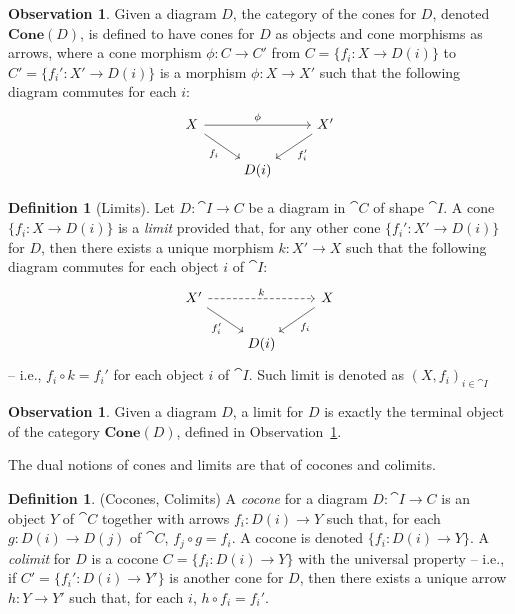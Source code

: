 \documentclass[a4paper, twoside,openright]{report}
\theoremstyle{plain}
\theoremstyle{definition}
\newtheorem{definition}[theorem]{Definition}
\newtheorem{obs}[theorem]{Observation}
\begin{document}
\begin{obs}\label{obs:category_of_cones}
    Given a diagram $D$, the category of the cones for $D$, denoted $\textbf{Cone}(D)$, is defined to have cones for $D$ as objects and cone morphisms as arrows, where a cone morphism $\phi: C \rightarrow C'$ from $C = \{f_i: X \rightarrow D(i)\}$ to $C' = \{f_i':X' \rightarrow D(i)\}$ is a morphism $\phi: X \rightarrow X'$ such that the following diagram commutes for each $i$:
    \[
        \begin{tikzcd}
            X \arrow[rr, "{\phi}"] \arrow[dr, "{f_i}" swap] & & X' \arrow[dl, "{f_i'}"] \\
            & D(i) &
        \end{tikzcd}
    \]
\end{obs}

\begin{definition}[Limits]\label{def:limit}
    Let $D:\cat {I \rightarrow C}$ be a diagram in $\cat C$ of shape $\cat I$. A cone $\{f_i: X \rightarrow D(i)\}$ is a \emph{limit} provided that, for any other cone $\{f_{i}': X' \rightarrow D(i)\}$ for $D$, then there exists a unique morphism $k: X' \rightarrow X$ such that the following diagram commutes for each object $i$ of $\cat I$:
    \[
        \begin{tikzcd}
            X' \arrow[rr, dashed, "k"] \arrow[dr, "{f_i'}" swap] & & X \arrow[dl, "{f_i}"] \\
            & D(i) &
        \end{tikzcd}
    \]
    -- i.e., $f_i \circ k = f_i'$ for each object $i$ of $\cat I$. Such limit is denoted as $(X, f_i)_{i \in \cat I}$
\end{definition}

\begin{obs}
    Given a diagram $D$, a limit for $D$ is exactly the terminal object of the category $\textbf{Cone}(D)$, defined in Observation~\ref{obs:category_of_cones}.
\end{obs}

The dual notions of cones and limits are that of cocones and colimits.

\begin{definition}(Cocones, Colimits)
    A \emph{cocone} for a diagram $D: \cat{I \rightarrow C}$ is an object $Y$ of $\cat C$ together with arrows $f_i : D(i) \rightarrow Y$ such that, for each $g: D(i) \rightarrow D(j)$ of $\cat C$, $f_j \circ g = f_i$. A cocone is denoted $\{f_i: D(i) \rightarrow Y \}$.
    A \emph{colimit} for $D$ is a cocone $C = \{f_i: D(i) \rightarrow Y \}$ with the universal property -- i.e., if $C' = \{ f_i' : D(i) \rightarrow Y'\}$ is another cone for $D$, then there exists a unique arrow $h:Y \rightarrow Y'$ such that, for each $i$, $h \circ f_i = f_i'$.
\end{definition}
\end{document}
